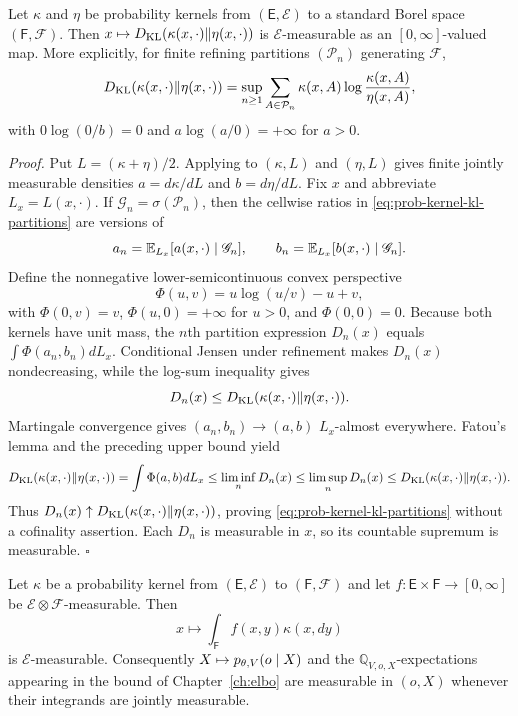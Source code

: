 \medskip
{}
Let $\kappa$ and $\eta$ be probability kernels from $(\mathsf E,\mathscr E)$ to a standard Borel space $(\mathsf F,\mathscr F)$.  Then $x\mapsto D_{\mathrm{KL}}(\kappa(x,\cdot)\Vert\eta(x,\cdot))$ is $\mathscr E$-measurable as an $[0,\infty]$-valued map.  More explicitly, for finite refining partitions $(\mathcal P_n)$ generating $\mathscr F$,
\begin{equation}
D_{\mathrm{KL}}(\kappa(x,\cdot)\Vert\eta(x,\cdot))
=\sup_{n\geq1}\sum_{A\in\mathcal P_n}
\kappa(x,A)\log\frac{\kappa(x,A)}{\eta(x,A)},
\label{eq:prob-kernel-kl-partitions}
\end{equation}
with $0\log(0/b)=0$ and $a\log(a/0)=+\infty$ for $a>0$. 
\medskip

\noindent\emph{Proof.} Put $L=(\kappa+\eta)/2$.  Applying
 to $(\kappa,L)$ and $(\eta,L)$
gives finite jointly measurable densities $a=d\kappa/dL$ and $b=d\eta/dL$.
Fix $x$ and abbreviate $L_x=L(x,\cdot)$.  If
$\mathscr G_n=\sigma(\mathcal P_n)$, then the cellwise ratios in
\eqref{eq:prob-kernel-kl-partitions} are versions of
\[
 a_n=\mathbb E_{L_x}[a(x,\cdot)\mid\mathscr G_n],\qquad
 b_n=\mathbb E_{L_x}[b(x,\cdot)\mid\mathscr G_n].
\]
Define the nonnegative lower-semicontinuous convex perspective
\[
 \Phi(u,v)=u\log(u/v)-u+v,
\]
with $\Phi(0,v)=v$, $\Phi(u,0)=+\infty$ for $u>0$, and
$\Phi(0,0)=0$.  Because both kernels have unit mass, the $n$th partition
expression $D_n(x)$ equals
$\int\Phi(a_n,b_n) dL_x$.  Conditional Jensen under refinement makes
$D_n(x)$ nondecreasing, while the log-sum inequality gives
\[
 D_n(x)\leq D_{\mathrm{KL}}(\kappa(x,\cdot)\Vert\eta(x,\cdot)).
\]
Martingale convergence gives $(a_n,b_n)\to(a,b)$ $L_x$-almost everywhere.
Fatou's lemma and the preceding upper bound yield
\[
 D_{\mathrm{KL}}(\kappa(x,\cdot)\Vert\eta(x,\cdot))
 =\int\Phi(a,b) dL_x
 \leq\liminf_nD_n(x)
 \leq\limsup_nD_n(x)
 \leq D_{\mathrm{KL}}(\kappa(x,\cdot)\Vert\eta(x,\cdot)).
\]
Thus $D_n(x)\uparrow D_{\mathrm{KL}}(\kappa(x,\cdot)\Vert\eta(x,\cdot))$, proving
\eqref{eq:prob-kernel-kl-partitions} without a cofinality assertion.  Each
$D_n$ is measurable in $x$, so its countable supremum is measurable. \hfill$\square$

\medskip
{}
Let $\kappa$ be a probability kernel from $(\mathsf E,\mathscr E)$ to $(\mathsf F,\mathscr F)$ and let $f:\mathsf E\times\mathsf F\to[0,\infty]$ be $\mathscr E\otimes\mathscr F$-measurable. Then
\begin{equation}
x\longmapsto\int_{\mathsf F}f(x,y)\kappa(x,dy)
\label{eq:prob-kernel-integration}
\end{equation}
is $\mathscr E$-measurable. Consequently $X\mapsto p_{\theta,V}(o\mid X)$ and the $\mathbb Q_{V,o,X}$-expectations appearing in the bound of Chapter~\ref{ch:elbo} are measurable in $(o,X)$ whenever their integrands are jointly measurable. 
\medskip

